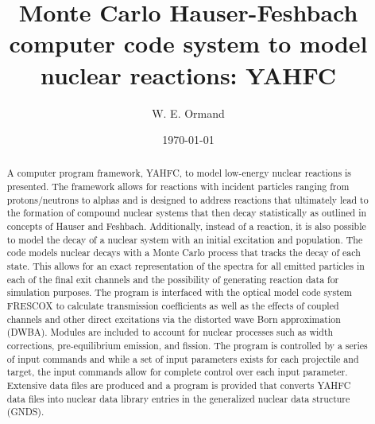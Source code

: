 \documentclass[
10pt,
showpacs,preprintnumbers,footinbib,
amsfonts,amsmath,amssymb,
aps,
prc,twocolumn,groupedaddress,superscriptaddress,
showkeys,
nofootinbib
]{revtex4-1}
\begin{document}
\title{Monte Carlo Hauser-Feshbach computer code system to model nuclear reactions: YAHFC  }

\author{W. E. Ormand}

\date{\today}


\begin{abstract}
A computer program framework, YAHFC, to model low-energy nuclear reactions is presented. The framework allows for reactions with incident particles ranging from protons/neutrons to alphas and is designed to address reactions that ultimately lead to the formation of compound nuclear systems that then decay statistically as outlined in concepts of Hauser and Feshbach.  Additionally, instead of a reaction, it is also possible to model the decay of a nuclear system with an initial excitation and population. The code models nuclear decays with a Monte Carlo process that tracks the decay of each state. This allows for an exact representation of the spectra for all emitted particles in each of the final exit channels and the possibility of generating reaction data for simulation purposes. The program is interfaced with the optical model code system FRESCOX to calculate transmission coefficients as well as the effects of coupled channels and other direct excitations via the distorted wave Born approximation (DWBA). Modules are included to account for nuclear processes such as width corrections, pre-equilibrium emission, and fission. The program is controlled by a series of input commands and while a set of input parameters exists for each projectile and target, the input commands allow for complete control over each input parameter. Extensive data files are produced and a program is provided that converts YAHFC data files into nuclear data library entries in the generalized nuclear data structure (GNDS). 
\end{abstract}


\maketitle
\end{document}
